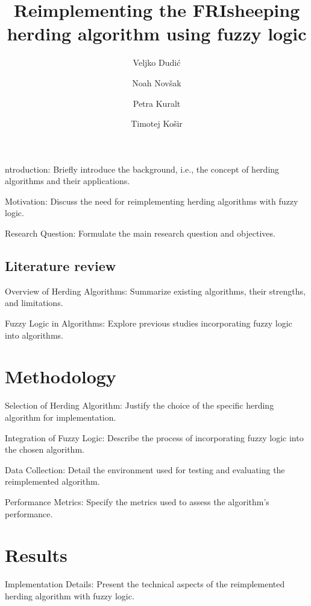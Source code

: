 \documentclass[9pt]{pnas-new}
\title{Reimplementing the FRIsheeping herding algorithm using fuzzy logic}
\author{Veljko Dudić}
\author{Noah Novšak}
\author{Petra Kuralt}
\author{Timotej Košir}
\affil{Collective behavior course research seminar report}
\begin{document}
\verticaladjustment{-2pt}

\maketitle
\thispagestyle{firststyle}

ntroduction: Briefly introduce the background, i.e., the concept of herding algorithms and their applications.

Motivation: Discuss the need for reimplementing herding algorithms with fuzzy logic.

Research Question: Formulate the main research question and objectives.

\subsection*{Literature review}
Overview of Herding Algorithms: Summarize existing algorithms, their strengths, and limitations. \cite{shepherdingalgorithm} \cite{optimalshepherding}

Fuzzy Logic in Algorithms: Explore previous studies incorporating fuzzy logic into algorithms. \cite{fuzzylogic} \cite{modellingcrowd}

\section*{Methodology}
Selection of Herding Algorithm: Justify the choice of the specific herding algorithm for implementation. \cite{behaviorbased}

Integration of Fuzzy Logic: Describe the process of incorporating fuzzy logic into the chosen algorithm.

Data Collection: Detail the environment used for testing and evaluating the reimplemented algorithm.

Performance Metrics: Specify the metrics used to assess the algorithm's performance.

\section*{Results}
Implementation Details: Present the technical aspects of the reimplemented herding algorithm with fuzzy logic.
\end{document}
